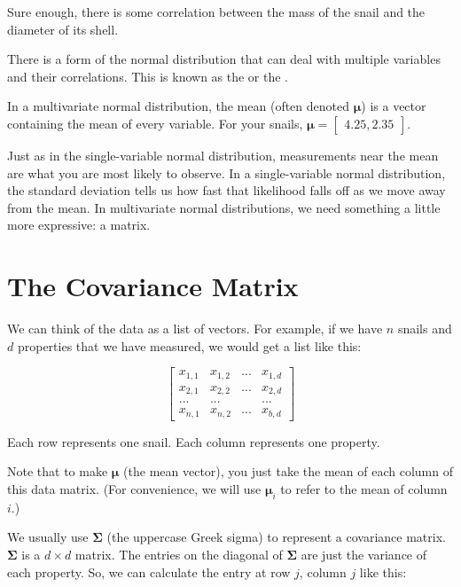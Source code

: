 Sure enough, there is some correlation between the mass of the snail and the diameter of its shell.

There is a form of the normal distribution that can deal with multiple variables and their correlations.
This is known as the  or the .  

In a multivariate normal distribution, the mean (often denoted $\boldsymbol\mu$) is a vector containing the mean of every variable.
For your snails, $\boldsymbol\mu = \begin{bmatrix} 4.25, 2.35 \end{bmatrix}$.

Just as in the single-variable normal distribution, measurements near the mean are what you are most likely to observe.
In a single-variable normal distribution, the standard deviation tells us how fast that likelihood falls off as we move away from the mean.
In multivariate normal distributions, we need something a little more expressive: a matrix.

\section{The Covariance Matrix}

We can think of the data as a list of vectors.
For example, if we have $n$ snails and $d$ properties that we have measured, we would get a list like this:

$$\begin{bmatrix}
x_{1,1} & x_{1,2} & ... & x_{1,d} \\
x_{2,1} & x_{2,2} & ... & x_{2,d} \\
... & ... & &... \\
x_{n,1} & x_{n,2} & ... & x_{b,d}\end{bmatrix}$$

Each row represents one snail. Each column represents one property.

Note that to make $\boldsymbol\mu$ (the mean vector), you just take the mean of each column of this data matrix. (For convenience, we will use $\boldsymbol\mu_i$ to refer to the mean of column $i$.)

We usually use $\mathbf{\Sigma}$ (the uppercase Greek sigma) to represent a covariance matrix. $\mathbf{\Sigma}$ is a $d \times d$ matrix.
The entries on the diagonal of $\mathbf{\Sigma}$ are just the variance of each property.
So, we can calculate the entry at row $j$, column $j$ like this:

